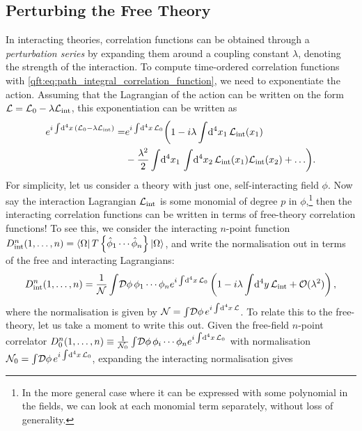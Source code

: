 \documentclass[../main.tex]{subfiles}
\begin{document}
\subsection{Perturbing the Free Theory}
In interacting theories, correlation functions can be obtained through a \emph{perturbation series} by expanding them around a coupling constant \(\lambda\), denoting the strength of the interaction.
To compute time-ordered correlation functions with \cref{qft:eq:path_integral_correlation_function}, we need to exponentiate the action.
Assuming that the Lagrangian of the action can be written on the form \(\mathcal{L} = \mathcal{L}_0 - \lambda\mathcal{L}_\text{int}\), this exponentiation can be written as
\begin{align}
  \label{qft:eq:Lint_exp_expansion}
  e^{i \int \!\mathrm{d}^4x\, \left(\mathcal{L}_0 - \lambda\mathcal{L}_\text{int}\right)} = & e^{i \int \!\mathrm{d}^4x\, \mathcal{L}_0} \biggl(1 - i\lambda\int \!\mathrm{d}^4x_1\, \mathcal{L}_\text{int}(x_1)                            \\
                                                                 & - \frac{\lambda^2}{2} \int \!\mathrm{d}^4x_1\,\int \!\mathrm{d}^4x_2\, \mathcal{L}_\text{int}(x_1) \mathcal{L}_\text{int}(x_2) + \ldots\biggr).
\end{align}
For simplicity, let us consider a theory with just one, self-interacting field \(\phi\).
Now say the interaction Lagrangian \(\mathcal{L}_\text{int}\) is some monomial of degree \(p\) in \(\phi\),\footnote{In the more general case where it can be expressed with some polynomial in the fields, we can look at each monomial term separately, without loss of generality.} then the interacting correlation functions can be written in terms of free-theory correlation functions!
To see this, we consider the interacting \(n\)-point function \(D^n_\text{int}(1,\ldots, n) = \left\langle \Omega \right| T\left\{\hat\phi_1 \cdots \hat\phi_n\right\} \left| \Omega \right\rangle\), and write the normalisation out in terms of the free and interacting Lagrangians:
\begin{align}
  \label{qft:eq:n-point_interactive_correlator}
  D^n_\text{int}(1,\ldots, n) = \frac{1}{\mathcal{N}} \int\!\mathcal{D}\phi\, \phi_1\cdots \phi_n e^{i\int \!\mathrm{d}^4x\,\mathcal{L}_0}\left(1 - i\lambda \int \!\mathrm{d}^4y\,\mathcal{L}_\text{int} + \mathcal{O}(\lambda^2)\right),
\end{align}
where the normalisation is given by \(\mathcal{N} = \int\!\mathcal{D}\phi\, e^{i\int \!\mathrm{d}^4x\,\mathcal{L}}\).
To relate this to the free-theory, let us take a moment to write this out.
Given the free-field \(n\)-point correlator \(D^n_0(1,\ldots,n) \equiv \frac{1}{\mathcal{N}_0} \int\!\mathcal{D}\phi\, \phi_i \cdots \phi_n e^{i\int \!\mathrm{d}^4x\,\mathcal{L}_0}\) with normalisation \(\mathcal{N}_0 = \int\!\mathcal{D}\phi\, e^{i\int \!\mathrm{d}^4x\,\mathcal{L}_0}\), expanding the interacting normalisation gives
\end{document}
